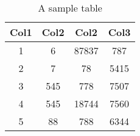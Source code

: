 \begin{table}[h]
    \centering
    \caption{A sample table}
    \label{tab:my_label}
    \begin{tabular}{||c| c c c||}
        \hline
        Col1 & Col2 & Col2 & Col3 \\ [0.5ex]
        \hline\hline
        1 & 6 & 87837 & 787 \\
        \hline
        2 & 7 & 78 & 5415 \\
        \hline
        3 & 545 & 778 & 7507 \\
        \hline
        4 & 545 & 18744 & 7560 \\
        \hline
        5 & 88 & 788 & 6344 \\ [1ex]
        \hline
    \end{tabular}
\end{table}
